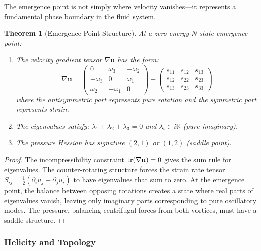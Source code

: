 \documentclass[12pt]{article}
\newcommand{\R}{\mathbb{R}}
\newtheorem{theorem}{Theorem}[section]
\begin{document}
The emergence point is not simply where velocity vanishes—it represents a fundamental phase boundary in the fluid system.

\begin{theorem}[Emergence Point Structure]
At a zero-energy N-state emergence point:
\begin{enumerate}
\item The velocity gradient tensor $\nabla \mathbf{u}$ has the form:
\begin{equation}
\nabla \mathbf{u} = \begin{pmatrix}
0 & \omega_3 & -\omega_2 \\
-\omega_3 & 0 & \omega_1 \\
\omega_2 & -\omega_1 & 0
\end{pmatrix} + \begin{pmatrix}
s_{11} & s_{12} & s_{13} \\
s_{12} & s_{22} & s_{23} \\
s_{13} & s_{23} & s_{33}
\end{pmatrix}
\end{equation}
where the antisymmetric part represents pure rotation and the symmetric part represents strain.

\item The eigenvalues satisfy: $\lambda_1 + \lambda_2 + \lambda_3 = 0$ and $\lambda_i \in i\R$ (pure imaginary).

\item The pressure Hessian has signature $(2,1)$ or $(1,2)$ (saddle point).
\end{enumerate}
\end{theorem}

\begin{proof}
The incompressibility constraint $\tr(\nabla \mathbf{u}) = 0$ gives the sum rule for eigenvalues. The counter-rotating structure forces the strain rate tensor $S_{ij} = \frac{1}{2}(\partial_i u_j + \partial_j u_i)$ to have eigenvalues that sum to zero. At the emergence point, the balance between opposing rotations creates a state where real parts of eigenvalues vanish, leaving only imaginary parts corresponding to pure oscillatory modes. The pressure, balancing centrifugal forces from both vortices, must have a saddle structure.
\end{proof}

\subsubsection{Helicity and Topology}
\end{document}
